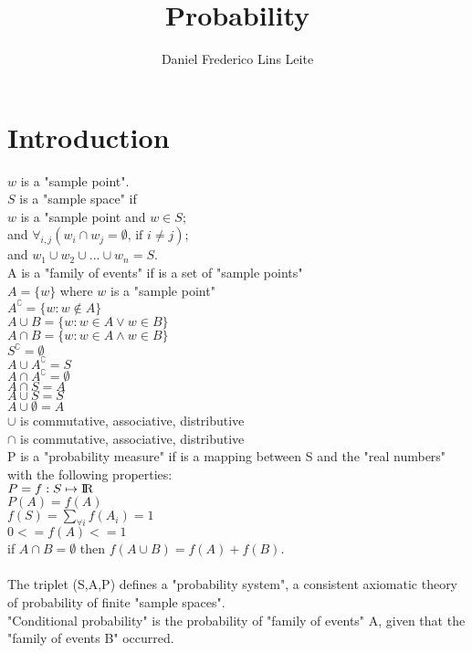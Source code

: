 \documentclass[10pt,a4paper]{book}
\author{Daniel Frederico Lins Leite}
\title{Probability}
\newcommand\tab[1][1cm]{\hspace*{#1}}
\begin{document}
	\section{Introduction}
	$w$ is a "sample point".\\
	$S$ is a "sample space" if\\
		\tab $w$ is a "sample point and $w \in S$;\\
		\tab and $\forall_{i,j}{(w_i \cap w_j = \emptyset \text{, if } i \neq j)}$;\\
		\tab and $w_1 \cup w_2 \cup ... \cup w_n = S$.\\
		A is a "family of events" if is a set of "sample points"\\
		\tab $A = \{w\}$ where $w$ is a "sample point"\\
		\tab $A^\complement = \{w : w \notin A\}$\\
		\tab $A \cup B = \{w: w \in A \lor w \in B\}$\\
		\tab $A \cap B = \{w: w \in A \land w \in B\}$\\
		\tab $S^\complement = \emptyset$\\
		\tab $A \cup A^\complement = S$\\
		\tab $A \cap A^\complement = \emptyset$\\
		\tab $A \cap S = A$\\
		\tab $A \cup S = S$\\
		\tab $A \cup \emptyset = A$\\
		\tab $\cup$ is commutative, associative, distributive\\
		\tab $\cap$ is commutative, associative, distributive\\
		P is a "probability measure" if is a mapping between S and the "real numbers" with the following properties:\\
		\tab $P = f: S \mapsto {\rm I\!R}$\\
		\tab $P(A) = f(A)$\\
		\tab $f(S) = \sum_{\forall i}{f(A_i)} = 1$\\
		\tab $0 <= f(A) <= 1$\\
		\tab if $A \cap B = \emptyset$ then $f(A \cup B) = f(A) + f(B).$\\
		\\
		The triplet (S,A,P) defines a "probability system", a consistent axiomatic theory of probability of finite "sample spaces".
		\\
		"Conditional probability" is the probability of "family of events" A, given that the "family of events B" occurred.\\
\end{document}

